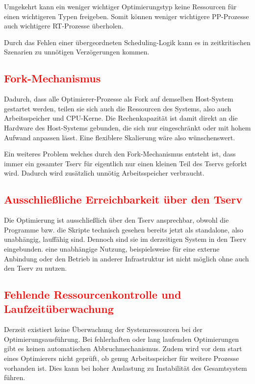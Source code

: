 Umgekehrt kann ein weniger wichtiger Optimierungstyp keine Ressourcen für einen wichtigeren Typen freigeben. Somit können weniger wichtigere PP-Prozesse auch wichtigere RT-Prozesse überholen.

Durch das Fehlen einer übergeordneten Scheduling-Logik kann es  in zeitkritischen Szenarien zu unnötigen Verzögerungen kommen.

\subsection{\textcolor{red}{Fork-Mechanismus}}
Dadurch, dass alle Optimierer-Prozesse als Fork auf demselben Host-System gestartet werden, teilen sie sich auch die Ressourcen des Systems, also auch Arbeitsspeicher und CPU-Kerne. Die Rechenkapazität ist damit direkt an die Hardware des Host-Systems gebunden, die sich nur eingeschränkt oder mit hohem Aufwand anpassen lässt. Eine flexiblere Skalierung wäre also wünschenswert.

Ein weiteres Problem welches durch den Fork-Mechanismus entsteht ist, dass immer ein gesamter Tserv für eigentlich nur einen kleinen Teil des Tservs geforkt wird. Dadurch wird zusätzlich unnötig Arbeitsspeicher verbraucht.

\subsection{\textcolor{red}{Ausschließliche Erreichbarkeit über den Tserv}}
Die Optimierung ist ausschließlich über den Tserv ansprechbar, obwohl die Programme bzw. die Skripte technisch gesehen bereits jetzt als standalone, also unabhängig, lauffähig sind. Dennoch sind sie im derzeitigen System in den Tserv eingebunden. eine unabhängige Nutzung, beispielsweise für eine externe Anbindung oder den Betrieb in anderer Infrastruktur ist nicht möglich ohne auch den Tserv zu nutzen.

\subsection{\textcolor{red}{Fehlende Ressourcenkontrolle und Laufzeitüberwachung}}
Derzeit existiert keine Überwachung der Systemressourcen bei der Optimierungsausführung. Bei fehlerhaften oder lang laufenden Optimierungen gibt es keinen automatischen Abbruchmechanismus. Zudem wird vor dem start eines Optimierers nicht geprüft, ob genug Arbeitsspeicher für weitere Prozesse vorhanden ist. Dies kann bei hoher Auslastung zu Instabilität des Gesamtsystem führen.

